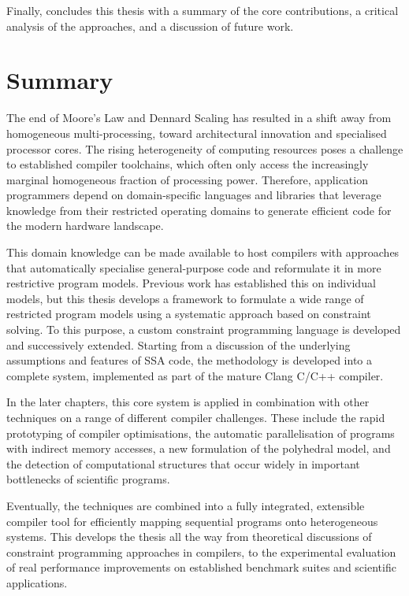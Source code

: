     Finally, {\bf{}} concludes this thesis with a summary
    of the core contributions, a critical analysis of the approaches, and a
    discussion of future work.

\section{Summary}

    The end of Moore's Law and Dennard Scaling has resulted in a shift away from
    homogeneous multi-processing, toward architectural innovation and
    specialised processor cores.
    The rising heterogeneity of computing resources poses a challenge to
    established compiler toolchains, which often only access the increasingly
    marginal homogeneous fraction of processing power.
    Therefore, application programmers depend on domain-specific languages and
    libraries that leverage knowledge from their restricted operating domains to
    generate efficient code for the modern hardware landscape.

    This domain knowledge can be made available to host compilers with
    approaches that automatically specialise general-purpose code and
    reformulate it in more restrictive program models.
    Previous work has established this on individual models, but this thesis
    develops a framework to formulate a wide range of restricted program models
    using a systematic approach based on constraint solving.
    To this purpose, a custom constraint programming language is developed
    and successively extended.
    Starting from a discussion of the underlying assumptions and features of
    SSA code, the methodology is developed into a complete system, implemented
    as part of the mature Clang C/C++ compiler.

    In the later chapters, this core system is applied in combination with other
    techniques on a range of different compiler challenges.
    These include the rapid prototyping of compiler optimisations, the
    automatic parallelisation of programs with indirect memory accesses, a new
    formulation of the polyhedral model, and the detection of computational
    structures that occur widely in important bottlenecks of scientific
    programs.

    Eventually, the techniques are combined into a fully integrated, extensible
    compiler tool for efficiently mapping sequential programs onto heterogeneous
    systems.
    This develops the thesis all the way from theoretical discussions of
    constraint programming approaches in compilers, to the experimental
    evaluation of real performance improvements on established benchmark suites
    and scientific applications.
